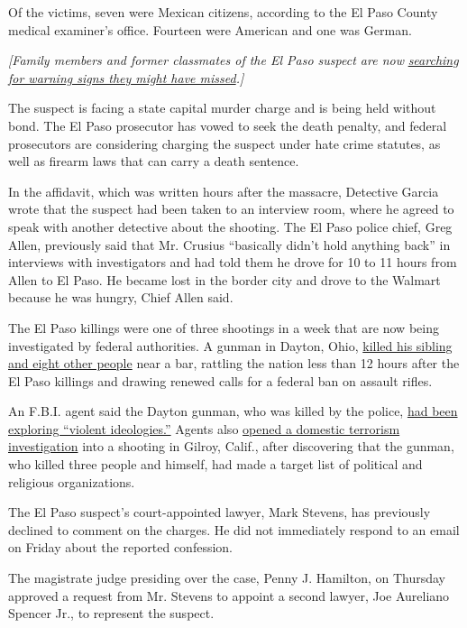 Of the victims, seven were Mexican citizens, according to the El Paso
County medical examiner's office. Fourteen were American and one was
German.

\emph{{[}Family members and former classmates of the El Paso suspect are
now}
\href{https://www.nytimes3xbfgragh.onion/2019/08/08/us/el-paso-suspect.html}{\emph{searching
for warning signs they might have missed}}\emph{.{]}}

The suspect is facing a state capital murder charge and is being held
without bond. The El Paso prosecutor has vowed to seek the death
penalty, and federal prosecutors are considering charging the suspect
under hate crime statutes, as well as firearm laws that can carry a
death sentence.

In the affidavit, which was written hours after the massacre, Detective
Garcia wrote that the suspect had been taken to an interview room, where
he agreed to speak with another detective about the shooting. The El
Paso police chief, Greg Allen, previously said that Mr. Crusius
``basically didn't hold anything back'' in interviews with investigators
and had told them he drove for 10 to 11 hours from Allen to El Paso. He
became lost in the border city and drove to the Walmart because he was
hungry, Chief Allen said.

The El Paso killings were one of three shootings in a week that are now
being investigated by federal authorities. A gunman in Dayton, Ohio,
\href{https://www.nytimes3xbfgragh.onion/2019/08/09/us/dayton-shooting-nan-whaley.html}{killed
his sibling and eight other people} near a bar, rattling the nation less
than 12 hours after the El Paso killings and drawing renewed calls for a
federal ban on assault rifles.

An F.B.I. agent said the Dayton gunman, who was killed by the police,
\href{https://www.nytimes3xbfgragh.onion/2019/08/06/us/mass-shootings.html}{had
been exploring ``violent ideologies.''} Agents also
\href{https://www.nytimes3xbfgragh.onion/2019/08/06/us/gilroy-calif-shooting-domestic-terrorism.html}{opened
a domestic terrorism investigation} into a shooting in Gilroy, Calif.,
after discovering that the gunman, who killed three people and himself,
had made a target list of political and religious organizations.

The El Paso suspect's court-appointed lawyer, Mark Stevens, has
previously declined to comment on the charges. He did not immediately
respond to an email on Friday about the reported confession.

The magistrate judge presiding over the case, Penny J. Hamilton, on
Thursday approved a request from Mr. Stevens to appoint a second lawyer,
Joe Aureliano Spencer Jr., to represent the suspect.

